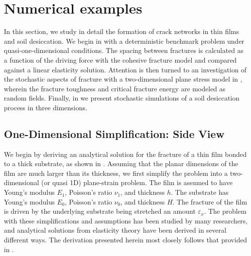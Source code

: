 \section{Numerical examples}
\label{section: Chapter4/examples}

In this section, we study in detail the formation of crack networks in thin films and soil desiccation.  We begin
in  with a deterministic benchmark problem under quasi-one-dimensional conditions.  The spacing between fractures is calculated as a function of the driving force with the cohesive fracture model and compared against a linear elasticity solution.
Attention is then turned to an investigation of the stochastic aspects of fracture with a two-dimensional plane stress model in , wherein the fracture toughness and critical fracture energy are modeled as random fields.
Finally, in  we present stochastic simulations of a soil desiccation process in three dimensions.

\subsection{One-Dimensional Simplification: Side View}
\label{section: Chapter4/examples/1D}

We begin by deriving an analytical solution for the fracture of a thin film bonded to a thick substrate, as shown in .  Assuming that the planar dimensions of the film are much larger than its thickness, we first simplify the problem into a two-dimensional (or quasi 1D) plane-strain problem. The film is assumed to have Young's modulus $E_1$, Poisson's ratio $\nu_1$, and thickness $h$. The substrate has Young's modulus $E_0$, Poisson's ratio $\nu_0$, and thickness $H$.  The fracture of the film is driven by the underlying substrate being stretched an amount $\varepsilon_x$.  The problem with these simplifications and assumptions has been studied by many researchers, and analytical solutions from elasticity theory have been derived in several different ways.  The derivation presented herein most closely follows that provided in \citet{yin2008explicit}.

